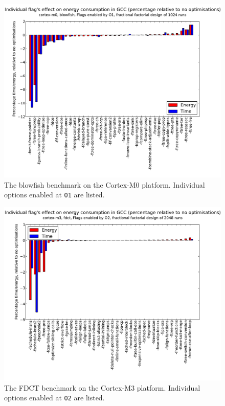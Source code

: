 \documentclass[twocolumn]{article}
\let\oldcaption\caption
\renewcommand{\caption}[1]{\oldcaption{\textup{#1}}}
\begin{document}
\begin{figure}[t]
	\includegraphics[width=\linewidth]{cortex-m0/O1_main_effects_blowfish.pdf}
	\caption{The blowfish benchmark on the Cortex-M0 platform. Individual options enabled at \texttt{O1} are listed.}
	\label{Fig:BlowfishMainEffects}
\end{figure}


\begin{figure}[t]
	\includegraphics[width=\linewidth]{cortex-m3/O2_main_effects_fdct.pdf}
	\caption{The FDCT benchmark on the Cortex-M3 platform. Individual options enabled at \texttt{O2} are listed.}
	\label{Fig:FdctO2MainEffects}
\end{figure}
\end{document}
